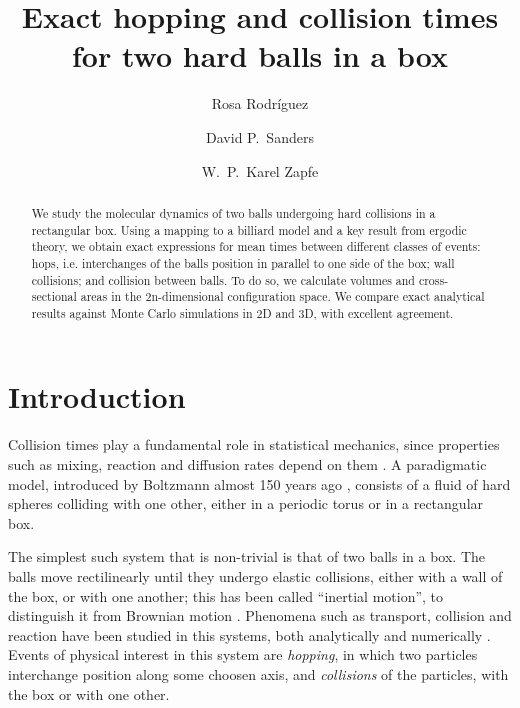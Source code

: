 \documentclass[superscriptaddress,pre,reprint,showpacs,twocolumn]{revtex4-1}
\begin{document}
\title{Exact hopping and collision times for two hard balls in a box}

\author{Rosa Rodríguez}

\author{David P.~Sanders}

\author{W.~P.~Karel Zapfe}



\begin{abstract}
We study the molecular dynamics of two balls undergoing hard collisions in a rectangular box.
Using a mapping to a billiard model and a key result from ergodic theory, we obtain exact expressions for mean times between different classes of events:
hops, i.e. interchanges of the balls position in parallel to one side of the box;
wall collisions; and collision between balls.
To do so, we calculate
volumes and cross-sectional areas in the 2n-dimensional configuration space.
We compare exact analytical results against Monte Carlo simulations in 2D and 3D,
with excellent agreement.
\end{abstract}

\maketitle


\section{Introduction}


Collision times play a fundamental role in statistical mechanics, since properties
such as mixing, reaction and diffusion rates depend on them \cite{Boltz72, Tolman, VanKampen}.
A paradigmatic model, introduced by Boltzmann almost 150 years ago \cite{Boltz72, SzaszBook00},
consists of a fluid of hard spheres colliding with one other, either in a periodic torus or in
a rectangular box.

The simplest such system that is non-trivial is that of two balls in a box.
The balls move rectilinearly until they undergo
elastic collisions, either with a wall of the box, or with one another; this has been called ``inertial motion'', to distinguish it from Brownian motion \cite{Bowles04}.
Phenomena such as transport, collision and reaction
have been studied in this systems, both analytically 
 \cite{Awazu01, Munakata02, Suh05} and numerically \cite{MacElroy2004, MacElroy2005}.
 Events of physical interest in this system are \emph{hopping},
in which two particles interchange position along some choosen axis,
and \emph{collisions} of the particles, with the box or with one other.
\end{document}
